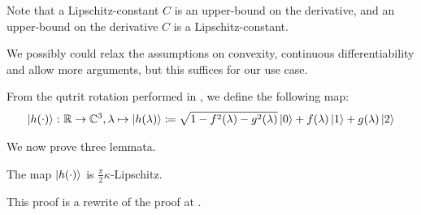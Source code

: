 \begin{remark}
    Note that a Lipschitz-constant \(C\) is an upper-bound on the derivative, and an upper-bound on the derivative \(C\) is a Lipschitz-constant.
\end{remark}

\begin{remark}
    We possibly could relax the assumptions on convexity, continuous differentiability and allow more arguments, but this suffices for our use case. 
\end{remark}

From the qutrit rotation performed in , we define the following map:
\begin{align}
    \ket{h(\cdot)}\colon \mathbb{R} \to \mathbb{C}^{3}, \lambda \mapsto \ket{h(\lambda)} \coloneqq \sqrt{1-f^2(\lambda)-g^2(\lambda)}\ket{0}+f(\lambda)\ket{1}+g(\lambda)\ket{2}
\end{align}

We now prove three lemmata.

\begin{lemma} \label{h_lipschitz}
    The map \(\ket{h(\cdot)}\) is \(\frac{\pi}{2} \kappa\)-Lipschitz.
\end{lemma}

This proof is a rewrite of the proof at \cite[p. 7]{Harrow2008}.

